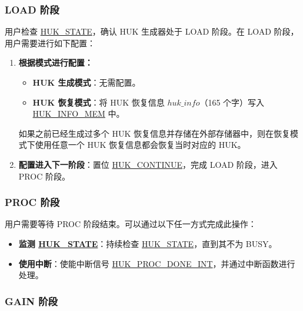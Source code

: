 \documentclass[main\_\_CN.tex]{subfiles}
\begin{document}
\subsubsection{LOAD 阶段}

用户检查 \hyperref[fielddesc:HUKSTATE]{HUK\_STATE}，确认 HUK 生成器处于 LOAD 阶段。在 LOAD 阶段，用户需要进行如下配置：
\begin{enumerate}
    \item \textbf{根据模式进行配置：}
    \begin{itemize}
        \item \textbf{HUK 生成模式}：无需配置。
        \item \textbf{HUK 恢复模式}：将 HUK 恢复信息 \hyperref[para:hukinfo]{\begin{math}huk\_info\end{math}}（165 个字）写入 \hyperref[mem:huk-info]{HUK\_INFO\_MEM} 中。
    \end{itemize}
    \vspace{-0.5em}
    \begin{tiplisting}
    如果之前已经生成过多个 HUK 恢复信息并存储在外部存储器中，则在恢复模式下使用任意一个 HUK 恢复信息都会恢复当时对应的 HUK。
    \end{tiplisting}
    \item \textbf{配置进入下一阶段}：置位 \hyperref[fielddesc:HUKCONTINUE]{HUK\_CONTINUE}，完成 LOAD 阶段，进入 PROC 阶段。
\end{enumerate}

\subsubsection{PROC 阶段}

用户需要等待 PROC 阶段结束。可以通过以下任一方式完成此操作：
\begin{itemize}
    \item \textbf{监测 \hyperref[fielddesc:HUKSTATE]{HUK\_STATE}}：持续检查 \hyperref[fielddesc:HUKSTATE]{HUK\_STATE}，直到其不为 BUSY。
    \item \textbf{使用中断}：使能中断信号 \hyperref[int:HUKPROCDONEINT]{HUK\_PROC\_DONE\_INT}，并通过中断函数进行处理。
\end{itemize}

\subsubsection{GAIN 阶段}
\end{document}

